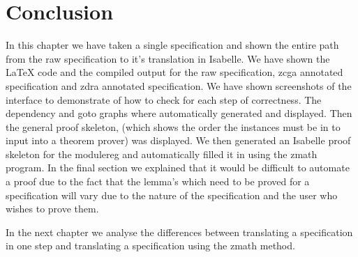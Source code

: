 \section{Conclusion}
In this chapter we have taken a single specification and shown the entire path
from the raw specification to it's translation in Isabelle. We have shown the
\LaTeX{} code and the compiled output for the raw specification, \gls{zcga}
annotated specification and \gls{zdra} annotated specification. We have shown
screenshots of the interface to demonstrate of how to check for each step of
correctness. The dependency and goto graphs where automatically generated and
displayed. Then the general proof skeleton, (which shows the order the instances
must be in to input into a theorem prover) was displayed. We then generated an
Isabelle proof skeleton for the modulereg and automatically filled it in
using the \gls{zmath} program. In the final section we explained that it would
be difficult to automate a proof due to the fact that the lemma's which need to
be proved for a specification will vary due to the nature of the specification
and the user who wishes to prove them. 

In the next chapter we analyse the differences between translating a
specification in one step and translating a specification using the \gls{zmath}
method.